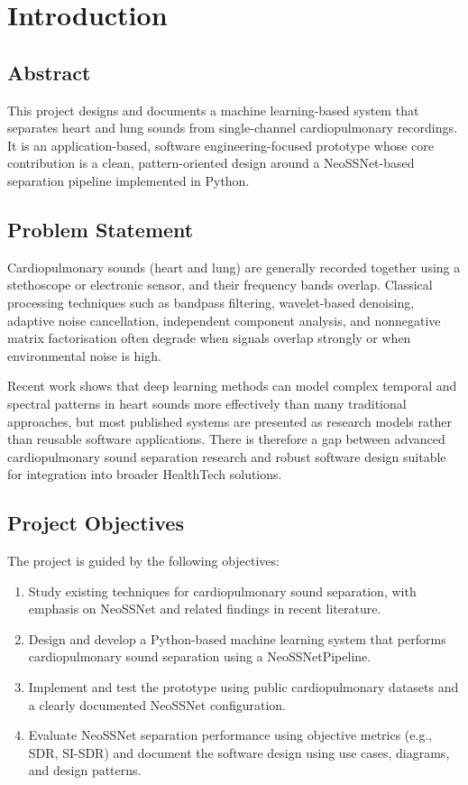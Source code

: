 \documentclass[12pt,a4paper]{report}
\begin{document}
\clearpage
{}

\section{Introduction}

\subsection{Abstract}
This project designs and documents a machine learning-based system that separates heart and lung sounds from single-channel cardiopulmonary recordings. It is an application-based, software engineering-focused prototype whose core contribution is a clean, pattern-oriented design around a NeoSSNet-based separation pipeline implemented in Python.

\subsection{Problem Statement}
Cardiopulmonary sounds (heart and lung) are generally recorded together using a stethoscope or electronic sensor, and their frequency bands overlap. Classical processing techniques such as bandpass filtering, wavelet-based denoising, adaptive noise cancellation, independent component analysis, and nonnegative matrix factorisation often degrade when signals overlap strongly or when environmental noise is high.\citep{sun2024review}

Recent work shows that deep learning methods can model complex temporal and spectral patterns in heart sounds more effectively than many traditional approaches, but most published systems are presented as research models rather than reusable software applications.\citep{zhao2024deep} There is therefore a gap between advanced cardiopulmonary sound separation research and robust software design suitable for integration into broader HealthTech solutions.

\subsection{Project Objectives}
The project is guided by the following objectives:
\begin{enumerate}[nosep]
  \item Study existing techniques for cardiopulmonary sound separation, with emphasis on NeoSSNet and related findings in recent literature.
  \item Design and develop a Python-based machine learning system that performs cardiopulmonary sound separation using a NeoSSNetPipeline.
  \item Implement and test the prototype using public cardiopulmonary datasets and a clearly documented NeoSSNet configuration.
  \item Evaluate NeoSSNet separation performance using objective metrics (e.g., SDR, SI-SDR) and document the software design using use cases, diagrams, and design patterns.
\end{enumerate}
\end{document}
